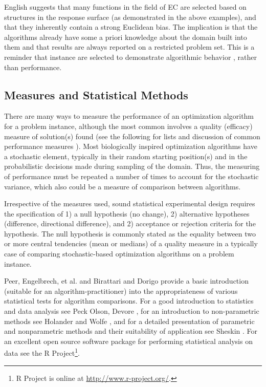 English \cite{English1996} suggests that many functions in the field of EC are selected based on structures in the response surface (as demonstrated in the above examples), and that they inherently contain a strong Euclidean bias. The implication is that the algorithms already have some a priori knowledge about the domain built into them and that results are always reported on a restricted problem set. This is a reminder that instance are selected to demonstrate algorithmic behavior , rather than performance.

% 
% 
\subsection{Measures and Statistical Methods}
There are many ways to measure the performance of an optimization algorithm for a problem instance, although the most common involves a quality (efficacy) measure of solution(s) found (see the following for lists and discussion of common performance measures \cite{Bartz-Beielstein2004, Birattari2005a, Hughes2006, Eiben2002, Barr1995}). Most biologically inspired optimization algorithms have a stochastic element, typically in their random starting position(s) and in the probabilistic decisions made during sampling of the domain. Thus, the measuring of performance must be repeated a number of times to account for the stochastic variance, which also could be a measure of comparison between algorithms.

Irrespective of the measures used, sound statistical experimental design requires the specification of 1) a null hypothesis (no change), 2) alternative hypotheses (difference, directional difference), and 2) acceptance or rejection criteria for the hypothesis. The null hypothesis is commonly stated as the equality between two or more central tendencies (mean or medians) of a quality measure in a typically case	of comparing stochastic-based optimization algorithms on a problem instance.

Peer, Engelbrech, et al. \cite{Peer2003} and Birattari and Dorigo \cite{Birattari2005a} provide a basic introduction (suitable for an algorithm-practitioner) into the appropriateness of various statistical tests for algorithm comparisons. For a good introduction to statistics and data analysis see Peck Olson, Devore \cite{Peck2005}, for an introduction to non-parametric methods see Holander and Wolfe \cite{Hollander1999}, and for a detailed presentation of parametric and nonparametric methods and their suitability of application see Sheskin \cite{Hughes2006}. For an excellent open source software package for performing statistical analysis on data see the R Project\footnote{R Project is online at \url{http://www.r-project.org/}.}.

